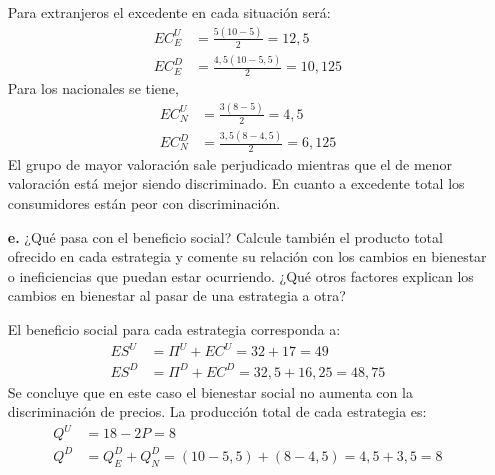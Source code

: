 \documentclass{exam}
\begin{document}
\begin{itemize}
\begin{solution}
        Para extranjeros el excedente en cada situación será:
        \begin{align*}
            EC^U_E &= \frac{5(10-5)}{2} = 12,5 \\
            EC^D_E &= \frac{4,5 (10-5,5)}{2} = 10,125
        \end{align*}
        Para los nacionales se tiene,
        \begin{align*}
            EC^U_N &= \frac{3(8-5)}{2} = 4,5 \\
            EC^D_N &= \frac{3,5(8-4,5)}{2} = 6,125
        \end{align*}
        El grupo de mayor valoración sale perjudicado mientras que el de menor valoración está mejor siendo discriminado. En cuanto a excedente total los consumidores están peor con discriminación. 
    \end{solution}
    \item[\textbf{e.}] ¿Qué pasa con el beneficio social? Calcule también el producto total ofrecido en cada estrategia y comente su relación con los cambios en bienestar o ineficiencias que puedan estar ocurriendo. ¿Qué otros factores explican los cambios en bienestar al pasar de una estrategia a otra?
    \begin{solution}
        El beneficio social para cada estrategia corresponda a:
        \begin{align*}
            ES^U &= \Pi^U + EC^U = 32+17 =49 \\
            ES^D &= \Pi^D + EC^D = 32,5 +16,25 = 48,75
        \end{align*}
        Se concluye que en este caso el bienestar social no aumenta con la discriminación de precios. La producción total de cada estrategia es:
        \begin{align*}
            Q^U &= 18-2P = 8 \\
            Q^D &= Q_E^D + Q_N^D = (10-5,5) + (8-4,5) = 4,5 +3,5 = 8
        \end{align*}
    \end{solution}
\end{itemize}
\end{document}
